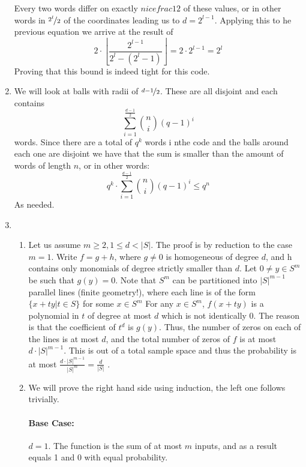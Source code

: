 \documentclass{article}
\newcommand\abs[1]{\left|#1\right|}
\begin{document}
\begin{enumerate}
            Every two words differ on exactly $nicefrac 12$ of these values, or in other words in $\nicefrac {2^{l}}2$ of the coordinates leading us to $d= 2^{l-1}$. Applying this to he previous equation we arrive at the result of \[2\cdot \left\lfloor \frac{2^{l-1}}{2^l- \left( 2^l-1 \right)}\right\rfloor = 2\cdot 2^{l-1}= 2^l\] Proving that this bound is indeed tight for this code.
        \item We will look at balls with radii of $\nicefrac{d-1}2$. These are all disjoint and each contains \[\sum_{i=1}^{\frac{d-1}{2}}{n \choose i} \left( q-1 \right)^i\] words. Since there are a total of $q^k$ words i nthe code and the balls around each one are disjoint we have that the sum is smaller than the amount of words of length $n$, or in other words: \[q^k\cdot  \sum_{i=1}^{\frac{d-1}{2}}{n \choose i} \left( q-1 \right)^i \le q^n\]
            As needed.
        \item \begin{enumerate}
                \item Let us assume $m \ge 2, 1 \le d < \abs{S}$. The proof is by reduction to the case $m = 1$. Write $f = g + h$, where $g \neq 0$ is homogeneous of degree $d$, and h contains only monomials of degree strictly smaller than $d$. Let $0 \neq y \in S^m$ be such that $g(y) = 0$. Note that $S^m$ can be partitioned into $\abs{S}^{m-1}$ parallel lines (finite geometry!), where each line is of the form $\{x + ty |t \in S\}$ for some $x \in S^m$ For any $x \in S^m$, $f(x + ty)$ is a  polynomial in $t$ of degree at most $d$ which is not identically 0. The reason is that the coefficient of $t^d$ is $g(y)$. Thus, the number of zeros on each of the lines is at most $d$, and the total number of zeros of $f$ is at most $d\cdot \abs{S}^{m-1}$. This is out of a total sample space and thus the probability is at most $\frac{d\cdot \abs{S}^{m-1}}{\abs{S}^m} = \frac{d}{\abs{S}}$
.
                \item We will prove the right hand side using induction, the left one follows trivially.
                \paragraph{Base Case:} $d=1$. The function is the sum of at most $m$ inputs, and as a result equals 1 and 0 with equal probability.

\end{enumerate}
\end{enumerate}
\end{document}
